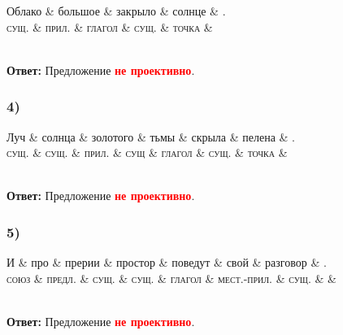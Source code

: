 \documentclass[14pt,extrafontsizes]{article}
\begin{document}
\begin{dependency}[theme = simple]
\begin{deptext}[column sep=1em]
Облако \& большое \& закрыло \& солнце \& . \\
\textsc{сущ.} \& \textsc{прил.} \& \textsc{глагол} \& \textsc{сущ.} \& \textsc{точка} \&\\
\end{deptext}
\end{dependency}
\\
\textbf{Ответ: }Предложение \textcolor{red}{\textbf{не проективно}}.
\\
\subsubsection*{4)}
\begin{dependency}[theme = simple]
\begin{deptext}[column sep=1em]
Луч \& солнца \& золотого \& тьмы \& скрыла \& пелена \& . \\
\textsc{сущ.} \& \textsc{сущ.} \& \textsc{прил.} \& \textsc{сущ} \& \textsc{глагол} \& \textsc{сущ.} \& \textsc{точка} \&\\
\end{deptext}
\end{dependency}
\\
\textbf{Ответ: }Предложение \textcolor{red}{\textbf{не проективно}}.
\\
\subsubsection*{5)}
\begin{dependency}[theme = simple]
\begin{deptext}[column sep=1em]
И \& про \& прерии \& простор \& поведут \& свой \& разговор \& . \\
\textsc{союз} \& \textsc{предл.} \& \textsc{сущ.} \& \textsc{сущ.} \& \textsc{глагол} \& \textsc{мест.-прил.} \& \textsc{сущ.} \& \textsc{} \&\\
\end{deptext}
\end{dependency}
\\
\textbf{Ответ: }Предложение \textcolor{red}{\textbf{не проективно}}.
\\
\end{document}

